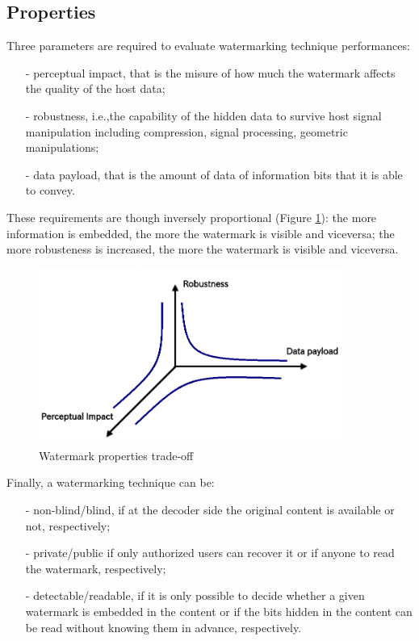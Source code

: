 \subsection{Properties}
Three parameters are required to evaluate watermarking technique performances:
\begin{itemize}
\item[-] perceptual impact, that is the misure of how much the watermark affects the quality of the host data;
\item[-] robustness, i.e.,the capability of the hidden data to survive host signal manipulation including compression, signal processing, geometric manipulations;
\item[-] data payload, that is the amount of data of information bits that it is able to convey.
\end{itemize}
These requirements are though inversely proportional (Figure \ref{fig:properties}): the more information is embedded, the more the watermark is visible and viceversa; the more robusteness is increased, the more the watermark is visible and viceversa.\\
\begin{figure}[h!]
\centering
\includegraphics[width=0.9\textwidth]{./img/properties.png}
\caption{\small{Watermark properties trade-off}}
\label{fig:properties}
\end{figure}
Finally, a watermarking technique can be:
\begin{itemize}
\item[-] non-blind/blind, if at the decoder side the original content is available or not, respectively;
\item[-] private/public if only authorized users
can recover it or if anyone to read the watermark, respectively;
\item[-] detectable/readable, if it is only possible to decide whether a given watermark is embedded in the content or if the bits hidden in the content can be read without knowing them in advance, respectively.
\end{itemize}




